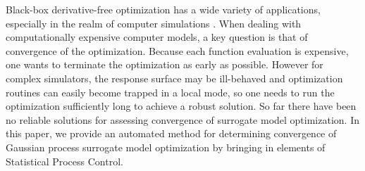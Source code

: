 \documentclass[12pt]{article}
\begin{document}

%
%

Black-box derivative-free optimization has a
wide variety of applications, especially in the realm of computer
simulations \citep{KoldLewiTorc2003,gramacy2014}.  
%
When dealing with computationally expensive computer
models, a key question is that of convergence of the optimization.
%
Because each function evaluation is expensive, one wants to terminate
the optimization as early as possible.  
%
However for complex simulators, the response surface may be ill-behaved and optimization
routines can easily become trapped in a local mode, so one needs to
run the optimization sufficiently long to achieve a robust solution.
%
So far there have been no reliable solutions for assessing convergence of surrogate model optimization.
In this paper, we provide an automated method for determining convergence of 
Gaussian process surrogate model optimization by bringing in elements
of Statistical Process Control.
\end{document}
